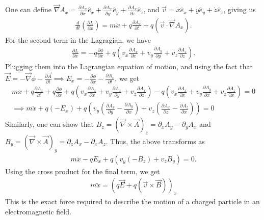 One can define $\vec{\nabla}A_{x} = \frac{\partial A_{x}}{\partial x} \hat{e}_{x} + \frac{\partial A_{x}}{\partial y} \hat{e}_{y} + \frac{\partial A_{x}}{\partial z} \hat{e}_{z}$, and $\vec{v} = \dot{x}\hat{e}_{x} + \dot{y}\hat{e}_{y} + \dot{z}\hat{e}_{z}$, giving us
\begin{align}
    \frac{d}{dt} \left( \frac{\partial L}{\partial \dot{x}} \right) = m\ddot{x} + q \frac{\partial A_{x}}{\partial t} + q (\vec{v} \cdot \vec{\nabla}A_{x}).
\end{align}
For the second term in the Lagragian, we have
\begin{align}
    \frac{\partial L}{\partial x} = -q\frac{\partial \phi}{\partial x} + q \left( v_{x} \frac{\partial A_{x}}{\partial x} + v_{y} \frac{\partial A_{y}}{\partial y} + v_{z} \frac{\partial A_{z}}{\partial z} \right).
\end{align}
Plugging them into the Lagrangian equation of motion, and using the fact that $\vec{E} = -\vec{\nabla} \phi - \frac{\partial \vec{A}}{\partial t} \implies E_{x} = -\frac{\partial \phi}{\partial x} - \frac{\partial A_{x}}{\partial t}$, we get
\begin{align}
    m\ddot{x} + q\frac{\partial A_{x}}{\partial t} + q\frac{\partial \phi}{\partial x} + q \left( v_{x}\frac{\partial A_{x}}{\partial x} + v_{y}\frac{\partial A_{x}}{\partial y} + v_{z}\frac{\partial A_{x}}{\partial z} \right) - q \left( v_{x} \frac{\partial A_{x}}{\partial x} + v_{y} \frac{\partial A_{y}}{\partial x} + v_{z} \frac{\partial A_{z}}{\partial x} \right) = 0 \\
    \implies m\ddot{x} + q(-E_{x}) + q \left( v_{y} \left( \frac{\partial A_{x}}{\partial y} - \frac{\partial A_{y}}{\partial x} \right) + v_{z} \left( \frac{\partial A_{x}}{\partial z} - \frac{\partial A_{z}}{\partial x} \right) \right) = 0
\end{align}
Similarly, one can show that $B_{z} = (\vec{\nabla} \times \vec{A})_{z} = \partial_{x}A_{y} - \partial_{y}A_{x}$ and $B_{y} = (\vec{\nabla} \times \vec{A})_{y} = \partial_{z}A_{x} - \partial_{x}A_{z}$. Thus, the above transforms as
\begin{align}
    m\ddot{x} -q E_{x} + q (v_{y}(-B_{z}) + v_{z}B_{y}) = 0.
\end{align}
Using the cross product for the final term, we get
\begin{align}
    m\ddot{x} = \left( q\vec{E} + q(\vec{v} \times \vec{B}) \right)_{x}
\end{align}
This is the exact force required to describe the motion of a charged particle in an electromagnetic field.\\

